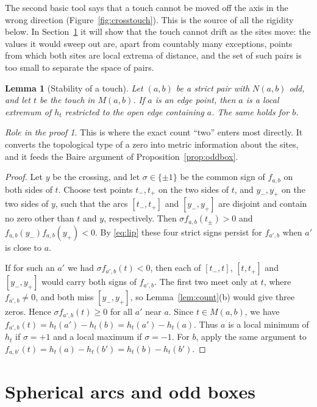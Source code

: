 \documentclass[11pt]{amsart}
\newtheorem{lemma}[theorem]{Lemma}
\theoremstyle{definition}
\theoremstyle{remark}
\newtheorem*{role}{Role in the proof}
\newcommand{\M}{M}
\newcommand{\N}{N}
\begin{document}
The second basic tool says that a touch cannot be moved off the axis in the wrong direction (Figure~\ref{fig:crosstouch}). This is the source of all the rigidity below. In Section~\ref{sec:spheres} it will show that the touch cannot drift as the sites move: the values it would sweep out are, apart from countably many exceptions, points from which both sites are local extrema of distance, and the set of such pairs is too small to separate the space of pairs.

\begin{lemma}[Stability of a touch]\label{lem:stability}
Let $(a,b)$ be a strict pair with $\N(a,b)$ odd, and let $t$ be the touch in $\M(a,b)$. If $a$ is an edge point, then $a$ is a local extremum of $h_t$ restricted to the open edge containing $a$. The same holds for $b$.
\end{lemma}

\begin{role}
This is where the exact count ``two'' enters most directly. It converts the topological type of a zero into metric information about the sites, and it feeds the Baire argument of Proposition~\ref{prop:oddbox}.
\end{role}

\begin{proof}
Let $y$ be the crossing, and let $\sigma\in\{\pm1\}$ be the common sign of $f_{a,b}$ on both sides of $t$. Choose test points $t_-,t_+$ on the two sides of $t$, and $y_-,y_+$ on the two sides of $y$, such that the arcs $[t_-,t_+]$ and $[y_-,y_+]$ are disjoint and contain no zero other than $t$ and $y$, respectively. Then $\sigma f_{a,b}(t_\pm)>0$ and $f_{a,b}(y_-)f_{a,b}(y_+)<0$. By \eqref{eq:lip} these four strict signs persist for $f_{a',b}$ when $a'$ is close to $a$.

If for such an $a'$ we had $\sigma f_{a',b}(t)<0$, then each of $[t_-,t]$, $[t,t_+]$ and $[y_-,y_+]$ would carry both signs of $f_{a',b}$. The first two meet only at $t$, where $f_{a',b}\ne0$, and both miss $[y_-,y_+]$, so Lemma~\ref{lem:count}(b) would give three zeros. Hence $\sigma f_{a',b}(t)\ge0$ for all $a'$ near $a$. Since $t\in\M(a,b)$, we have $f_{a',b}(t)=h_t(a')-h_t(b)=h_t(a')-h_t(a)$. Thus $a$ is a local minimum of $h_t$ if $\sigma=+1$ and a local maximum if $\sigma=-1$. For $b$, apply the same argument to $f_{a,b'}(t)=h_t(a)-h_t(b')=h_t(b)-h_t(b')$.
\end{proof}

\section{Spherical arcs and odd boxes}\label{sec:spheres}
\end{document}
